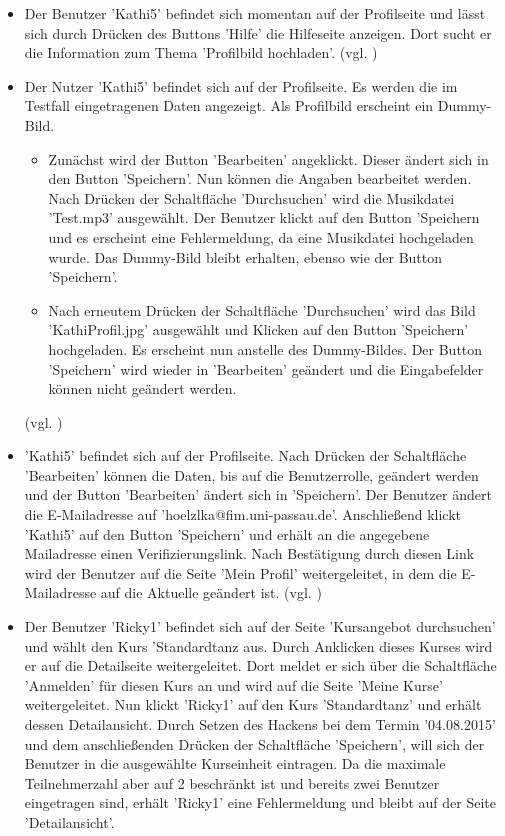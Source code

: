 \documentclass[a4paper]{scrreprt}
\begin{document}
\begin{itemize}
				\item {}
				Der Benutzer 'Kathi5' befindet sich momentan auf der Profilseite und lässt sich durch Drücken des Buttons 'Hilfe' die Hilfeseite anzeigen. Dort sucht er die Information zum Thema 'Profilbild hochladen'. (vgl. )
				
				\item {}
				Der Nutzer 'Kathi5' befindet sich auf der Profilseite. Es werden die im Testfall  eingetragenen Daten angezeigt. Als Profilbild erscheint ein Dummy-Bild. 
					\begin{itemize}
						\item Zunächst wird der Button 'Bearbeiten' angeklickt. Dieser ändert sich in den Button 'Speichern'. Nun können die Angaben bearbeitet werden. Nach Drücken der Schaltfläche 'Durchsuchen' wird die Musikdatei 'Test.mp3' ausgewählt. Der Benutzer klickt auf den Button 'Speichern und es erscheint eine Fehlermeldung, da eine Musikdatei hochgeladen wurde. Das Dummy-Bild bleibt erhalten, ebenso wie der Button 'Speichern'.
						\item Nach erneutem Drücken der Schaltfläche 'Durchsuchen' wird das Bild 'KathiProfil.jpg' ausgewählt und Klicken auf den Button 'Speichern' hochgeladen. Es erscheint nun anstelle des Dummy-Bildes.	Der Button 'Speichern' wird wieder in 'Bearbeiten' geändert und die Eingabefelder können nicht geändert werden.	
					\end{itemize}
				(vgl. )
									
				\item {}
				'Kathi5' befindet sich auf der Profilseite. Nach Drücken der Schaltfläche 'Bearbeiten' können die Daten, bis auf die Benutzerrolle, geändert werden und der Button 'Bearbeiten' ändert sich in 'Speichern'. Der Benutzer ändert die E-Mailadresse auf 'hoelzlka@fim.uni-passau.de'. Anschließend klickt 'Kathi5' auf den Button 'Speichern' und erhält an die angegebene Mailadresse einen Verifizierungslink. Nach Bestätigung durch diesen Link wird der Benutzer auf die Seite 'Mein Profil' weitergeleitet, in dem die E-Mailadresse auf die Aktuelle geändert ist. (vgl. )
				
				\item {}
				Der Benutzer 'Ricky1' befindet sich auf der Seite 'Kursangebot durchsuchen' und wählt den Kurs 'Standardtanz aus. Durch Anklicken dieses Kurses wird er auf die Detailseite weitergeleitet. Dort meldet er sich über die Schaltfläche 'Anmelden' für diesen Kurs an und wird auf die Seite 'Meine Kurse' weitergeleitet. Nun klickt 'Ricky1' auf den Kurs 'Standardtanz' und erhält dessen Detailansicht. Durch Setzen des Hackens bei dem Termin '04.08.2015' und dem anschließenden Drücken der Schaltfläche 'Speichern', will sich der Benutzer in die ausgewählte Kurseinheit eintragen. Da die maximale Teilnehmerzahl aber auf 2 beschränkt ist und bereits zwei Benutzer eingetragen sind, erhält 'Ricky1' eine Fehlermeldung und bleibt auf der Seite 'Detailansicht'.
				

\end{itemize}
\end{document}
